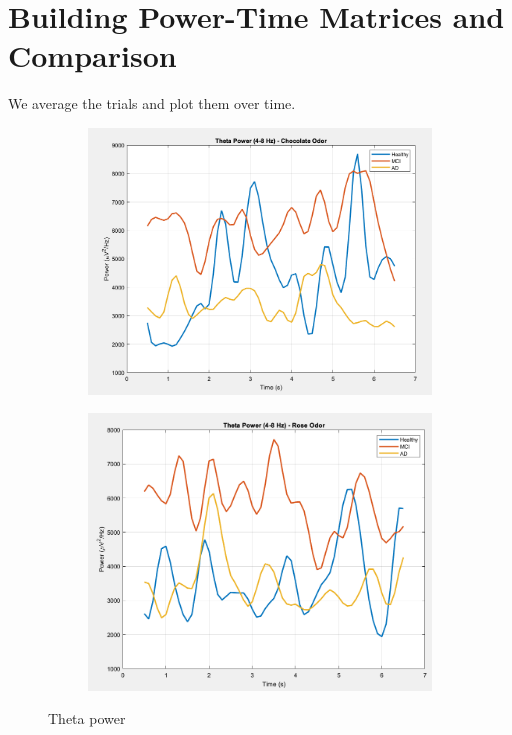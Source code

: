 \documentclass[hidelinks,12pt]{article}
\begin{document}
	\newpage

	\section{Building Power-Time Matrices and Comparison}
	We average the trials and plot them over time.
	
	\begin{figure}[!h]
		\centering
		\begin{subfigure}{0.48\textwidth}
			\centering
			\includegraphics[height=0.8\linewidth]{plots/1}
		\end{subfigure}
		\hfill
		\begin{subfigure}{0.48\textwidth}
			\centering
			\includegraphics[height=0.8\linewidth]{plots/3}
		\end{subfigure}
		\caption{Theta power}
	\end{figure}
	
\end{document}
